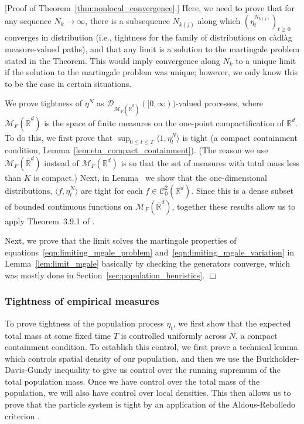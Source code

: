 \documentclass[12pt]{article}
\newenvironment {proof}{{\noindent\bf Proof }}{\hfill $\Box$ \medskip}
\newcommand{\IR}{\mathbb R}
\newcommand{\measures}{\mathcal{M}_F(\IR^d)} %
\newcommand{\cmeasures}{\mathcal{M}_F(\overline{\IR}^d)} %
\begin{document}
\begin{proof}[Proof of Theorem~\ref{thm:nonlocal_convergence}.]
Here, we need to prove that for any sequence $N_k \to \infty$,
there is a subsequence $N_{k(j)}$ along which $(\eta^{N_{k(j)}}_t)_{t\ge 0}$ converges in distribution
(i.e., tightness for the family of distributions on c\`adl\`ag measure-valued paths),
and that any limit is a solution to the martingale problem stated in the Theorem.
This would imply convergence along $N_k$ to a unique limit
if the solution to the martingale problem was unique;
however, we only know this to be the case in certain situations.

We prove tightness of $\eta^N$ as $\mathcal{D}_{\cmeasures}([0,\infty))$-valued processes,
where $\cmeasures$ is the space of finite measures on the one-point compactification of $\IR^d$.
To do this, we first prove that $\sup_{0 \le t \le T} \langle 1, \eta^N_t \rangle$ is tight
(a compact containment condition, Lemma~\ref{lem:eta_compact_containment}).
(The reason we use $\cmeasures$ instead of $\measures$
is so that the set of measures with total mass less than $K$ is compact.)
Next, in Lemma~ we show that the one-dimensional distributions,
$\langle f, \eta^N_t \rangle$ are tight
for each $f \in \mathcal{C}^2_0(\overline{\IR^d})$.
Since this is a dense subset of bounded continuous functions on $\cmeasures$,
together these results allow us to apply Theorem~3.9.1 of \citet{EK}.

Next, we prove that the limit solves the martingale properties
of equations~\eqref{eqn:limiting_mgale_problem} and~\eqref{eqn:limiting_mgale_variation}
in Lemma~\ref{lem:limit_mgale}
basically by checking the generators converge,
which was mostly done in Section~\ref{sec:population_heuristics}.
\end{proof}


\subsubsection{Tightness of empirical measures}
    \label{sec:population_tightness_proofs}

To prove tightness of the population process $\eta_t$,
we first show that the expected total mass at some fixed time $T$
is controlled uniformly across $N$, a compact containment condition.
To establish this control,
we first prove a technical lemma which controls spatial density of our population,
and then we use the Burkholder-Davis-Gundy inequality
to give us control over the running supremum of the total population mass.
Once we have control over the total mass of the population, 
we will also have control over local densities.
This then allows us to prove that the particle system is tight
by an application of the Aldous-Rebolledo criterion \citet{rebolledo:1980,alisonsup}.
\end{document}
